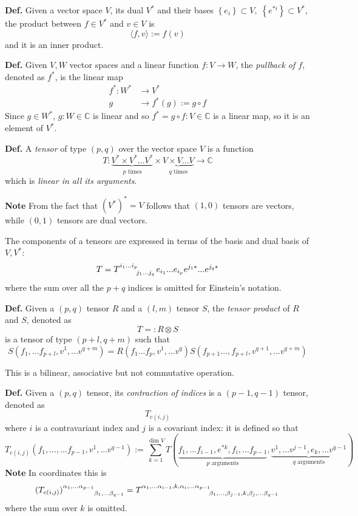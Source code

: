 
\textbf{Def.} Given a vector space $V$, its dual $V^*$ and their
bases $\left\{e_i\right\}\subset V,\;\left\{e^{*i}\right\}\subset V^*$, the
product between $f\in V^*$ and $v\in V$ is
$$\langle f,v\rangle := f(v)$$
and it is an inner product.

\textbf{Def.} Given $V,W$ vector spaces and a linear function $f:V\to W$, the
\textit{pullback of $f$}, denoted as $f^*$, is the linear map
\begin{align*}
    f^*:W^*&\to V^*\\
    g&\to f^*(g):=g\circ f 
\end{align*}
Since $g\in W^*$, $g:W\in\mathbb{C}$ is linear and so $f^*=g\circ f:V\in
\mathbb{C}$ is a linear map, so it is an element of $V^*$.

\textbf{Def.} A \textit{tensor} of type $(p,q)$ over the vector space $V$ is a
function
$$T:\underbrace{V^*\times V^*...V^*}_{p \text{ times}}\times \underbrace{V\times
V...V}_{q \text{ times}}\to\mathbb{C}$$
which is \textit{linear in all its arguments}.

\textbf{Note} From the fact that $(V^*)^*=V$ follows that $(1,0)$ tensors are
vectors, while $(0,1)$ tensors are dual vectors.

The components of a tensors are expressed in terms of the basis and dual basis
of $V,V^*$:
$$T = T\indices{^{i_1...i_p}_{j_1...j_q}}e_{i_1}...e_{i_p}e^{j_1*}...e^{j_q*}$$
where the sum over all the $p+q$ indices is omitted for Einstein's notation.

\textbf{Def.} Given a $(p,q)$ tensor $R$ and a $(l,m)$ tensor $S$, the \textit{
tensor product} of $R$ and $S$, denoted as
$$T=:R\otimes S$$
is a tensor of type $(p+l,q+m)$ such that
$$S(f_1,...f_{p+l},v^1,...v^{q+m}) = R(f_1...f_p,v^1,...v^q)
S(f_{p+1}...,f_{p+l}, v^{q+1},...v^{q+m})$$

This is a bilinear, associative but not commutative operation.

\textbf{Def.} Given a $(p,q)$ tensor, its \textit{contraction of indices} is a
$(p-1,q-1)$ tensor, denoted as
$$T_{c(i,j)}$$
where $i$ is a contravariant index and $j$ is a covariant index: it is defined so
that
$$T_{c(i,j)}(f_1,...,...f_{p-1},v^1,...v^{q-1}):=
\sum_{k=1}^{\dim V}T(
\underbrace{f_1,...f_{i-1},e^{*k},f_i,...f_{p-1}}_{p \text{ arguments}},
\underbrace{v^1,...v^{j-1},e_k,...v^{q-1}}_{q \text{ arguments}})$$
\textbf{Note} In coordinates this is
$$ (T_{c(i,j)})\indices{^{\alpha_1,...\alpha_{p-1}}_{
\beta_1,...\beta_{q-1}}}
= T\indices{^{\alpha_1,...\alpha_{i-1},k,\alpha_i,...
\alpha_{p-1}}_{\beta_1,...,\beta_{j-1},k,\beta_{j},...\beta_{q-1}}}$$
where the sum over $k$ is omitted.

